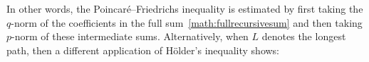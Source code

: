 \documentclass[10pt,a4paper]{article}
\begin{document}
\begin{remark}
    In other words, the Poincar\'e--Friedrichs inequality is estimated by first taking the $q$-norm of the coefficients in the full sum~\eqref{math:fullrecursivesum} and then taking $p$-norm of these intermediate sums.
    Alternatively, when $L$ denotes the longest path, then a different application of H\"older's inequality shows:
    

\end{remark}
\end{document}

